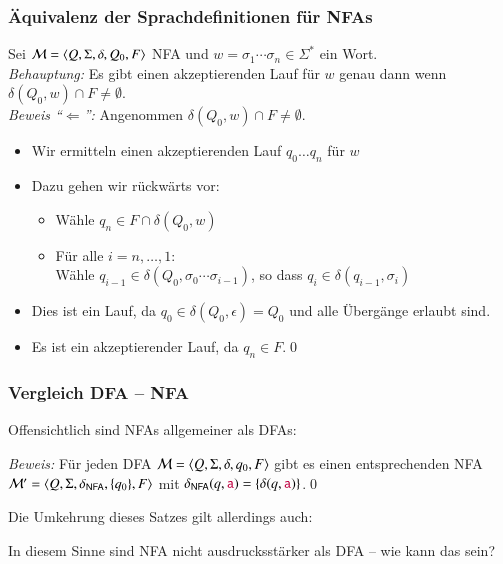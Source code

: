 \documentclass[onlymath,handout]{beamer}
\begin{document}
\begin{frame}[t]\frametitle{Äquivalenz der Sprachdefinitionen für NFAs}

Sei $\mathcal{M}=\langle{Q,\Sigma,\delta,Q_0,F}\rangle$ NFA und $w=\sigma_1\cdots\sigma_n\in\Sigma^*$ ein Wort.\\[1ex]

\emph{Behauptung:} Es gibt einen akzeptierenden Lauf für $w$ genau dann wenn
$\delta(Q_0,w)\cap F \neq \emptyset$.\\[1ex]

\emph{Beweis "`$\Leftarrow$"':}
Angenommen $\delta(Q_0,w)\cap F \neq \emptyset$.\pause
\begin{itemize}
\item Wir ermitteln einen akzeptierenden Lauf $q_0\ldots q_n$ für $w$\pause
\item Dazu gehen wir rückwärts vor:
\begin{itemize}
\item Wähle $q_n\in F\cap\delta(Q_0,w)$
\item Für alle $i=n,\ldots,1$:\\
Wähle $q_{i-1}\in\delta(Q_0,\sigma_0\cdots\sigma_{i-1})$, so dass $q_i\in\delta(q_{i-1},\sigma_i) $ 
\end{itemize}\pause
\item Dies ist ein Lauf, da $q_0\in\delta(Q_0,\epsilon)=Q_0$ und alle Übergänge erlaubt sind.
\item Es ist ein akzeptierender Lauf, da $q_n\in F$.\qed
\end{itemize}
\end{frame}



\begin{frame}\frametitle{Vergleich DFA -- NFA}

Offensichtlich sind NFAs allgemeiner als DFAs:


\emph{Beweis:} Für jeden DFA  $\mathcal{M}=\langle{Q,\Sigma,\delta,q_0,F}\rangle$ gibt es
einen entsprechenden NFA $\mathcal{M}'=\langle{Q,\Sigma,\delta_{\textsf{NFA}},\{q_0\},F}\rangle$
mit $\delta_{\textsf{NFA}}(q,\mathtt{\textcolor{purple}{a}}) = \{\delta(q,\mathtt{\textcolor{purple}{a}})\}$.\qed
\bigskip
\pause

Die Umkehrung dieses Satzes gilt allerdings auch:

In diesem Sinne sind NFA nicht ausdrucksstärker als DFA -- wie kann das sein?

\end{frame}
\end{document}
